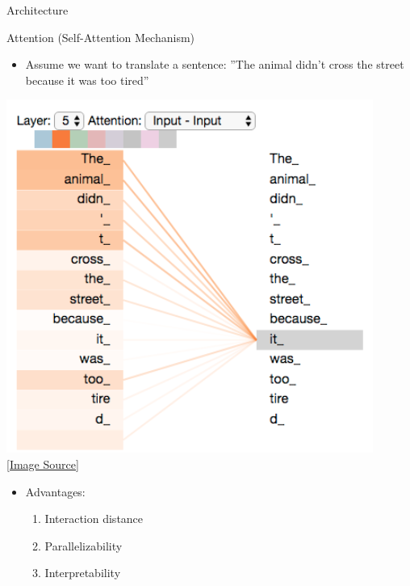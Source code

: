 \begin{frame}[fragile]{Architecture}
\begin{center}
    \end{center}

\end{frame}

\begin{frame}[fragile]{Attention (Self-Attention Mechanism)}

    \begin{itemize}
        \item Assume we want to translate a sentence: ”The animal didn't cross the street because it was too tired”
    \end{itemize}
    \begin{center}
        \includegraphics[scale=0.25]{../images/img_7.png} \\
        \href{https://jalammar.github.io/illustrated-transformer/}{[Image Source]}
    \end{center}
    \begin{itemize}
        \item Advantages:
              \begin{enumerate}
                  \item Interaction distance
                  \item Parallelizability
                  \item Interpretability
              \end{enumerate}
    \end{itemize}

\end{frame}